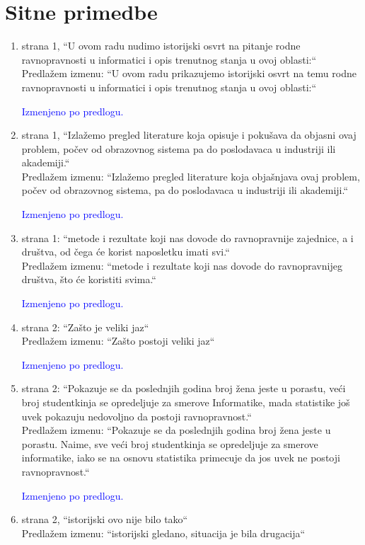 \documentclass[a4paper]{report}
\newcommand{\odgovor}[1]{\textcolor{blue}{#1}}
\begin{document}
\section{Sitne primedbe}
\begin{enumerate}
\item
strana 1, “U ovom radu nudimo istorijski osvrt na pitanje rodne ravnopravnosti u informatici i opis trenutnog stanja u ovoj oblasti:“ \\
Predlažem izmenu: “U ovom radu prikazujemo istorijski osvrt na temu rodne ravnopravnosti u informatici i opis trenutnog stanja u ovoj oblasti:“

\odgovor{Izmenjeno po predlogu.}
\item
strana 1, “Izlažemo pregled literature koja opisuje i pokušava da objasni ovaj problem, počev od obrazovnog sistema pa do poslodavaca u industriji ili akademiji.“ \\
Predlažem izmenu: “Izlažemo pregled literature koja objašnjava ovaj problem, počev od obrazovnog sistema, pa do poslodavaca u industriji ili akademiji.“

\odgovor{Izmenjeno po predlogu.}
\item
strana 1: “metode i rezultate koji nas dovode do ravnopravnije
zajednice, a i društva, od čega će korist naposletku imati svi.“ \\
Predlažem izmenu: “metode i rezultate koji nas dovode do ravnopravnijeg
društva, što će koristiti svima.“

\odgovor{Izmenjeno po predlogu.}
\item
strana 2: “Zašto je veliki jaz“  \\
Predlažem izmenu: “Zašto postoji veliki jaz“

\odgovor{Izmenjeno po predlogu.}
\item
strana 2: “Pokazuje se da poslednjih godina
broj žena jeste u porastu, veći broj studentkinja se opredeljuje za
smerove Informatike, mada statistike još uvek pokazuju nedovoljno da
postoji ravnopravnost.“  \\
Predlažem izmenu: “Pokazuje se da poslednjih godina
broj žena jeste u porastu. Naime, sve veći broj studentkinja se opredeljuje za smerove informatike, iako se na osnovu statistika primecuje da jos uvek ne postoji ravnopravnost.“

\odgovor{Izmenjeno po predlogu.}
\item
strana 2, “istorijski ovo nije bilo tako“  \\
Predlažem izmenu: “istorijski gledano, situacija je bila drugacija“


\end{enumerate}
\end{document}
